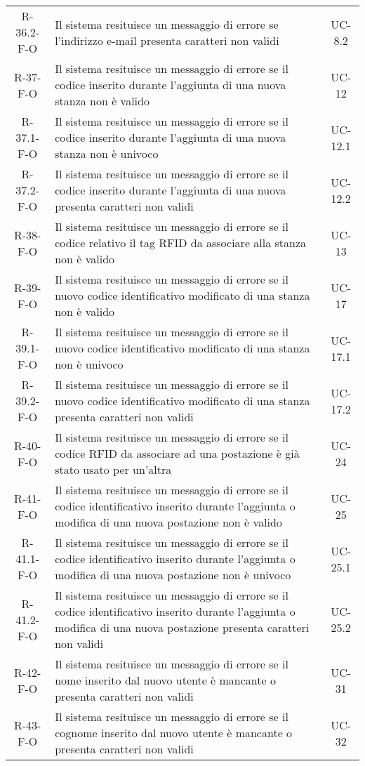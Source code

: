 \begin{longtable}{ c C{9.5cm} c }
    R-36.2-F-O & Il sistema resituisce un messaggio di errore se l'indirizzo e-mail presenta caratteri non validi& UC-8.2\\
    R-37-F-O & Il sistema resituisce un messaggio di errore se il codice inserito durante l'aggiunta di una nuova stanza non è valido& UC-12\\
    R-37.1-F-O & Il sistema resituisce un messaggio di errore se il codice inserito durante l'aggiunta di una nuova stanza non è univoco& UC-12.1\\
    R-37.2-F-O & Il sistema resituisce un messaggio di errore se il codice inserito durante l'aggiunta di una nuova presenta caratteri non validi& UC-12.2\\
    R-38-F-O & Il sistema resituisce un messaggio di errore se il codice relativo il tag RFID da associare alla stanza non è valido& UC-13\\
    R-39-F-O & Il sistema resituisce un messaggio di errore se il nuovo codice identificativo modificato di una stanza non è valido& UC-17\\
    R-39.1-F-O & Il sistema resituisce un messaggio di errore se il nuovo codice identificativo modificato di una stanza non è univoco& UC-17.1\\
    R-39.2-F-O & Il sistema resituisce un messaggio di errore se il nuovo codice identificativo modificato di una stanza presenta caratteri non validi& UC-17.2\\
    R-40-F-O & Il sistema resituisce un messaggio di errore se il codice RFID da associare ad una postazione è già stato usato per un'altra& UC-24\\
    R-41-F-O & Il sistema resituisce un messaggio di errore se il codice identificativo inserito durante l'aggiunta o modifica di una nuova postazione non è valido& UC-25\\
    R-41.1-F-O & Il sistema resituisce un messaggio di errore se il codice identificativo inserito durante l'aggiunta o modifica di una nuova postazione non è univoco& UC-25.1\\
    R-41.2-F-O & Il sistema resituisce un messaggio di errore se il codice identificativo inserito durante l'aggiunta o modifica di una nuova postazione presenta caratteri non validi& UC-25.2\\
    R-42-F-O & Il sistema resituisce un messaggio di errore se il nome inserito dal nuovo utente è mancante o presenta caratteri non validi& UC-31\\
    R-43-F-O & Il sistema resituisce un messaggio di errore se il cognome inserito dal nuovo utente è mancante o presenta caratteri non validi& UC-32\\

\end{longtable}
